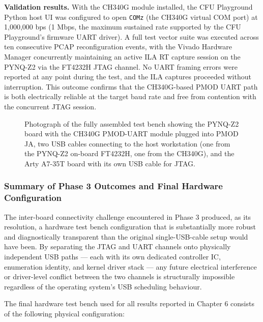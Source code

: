 \textbf{Validation results.} With the CH340G module installed, the CFU Playground Python host UI was configured to open \texttt{COMz} (the CH340G virtual COM port) at 1,000,000 bps (1 Mbps, the maximum sustained rate supported by the CFU Playground's firmware UART driver). A full test vector suite was executed across ten consecutive PCAP reconfiguration events, with the Vivado Hardware Manager concurrently maintaining an active ILA RT capture session on the PYNQ-Z2 via the FT4232H JTAG channel. No UART framing errors were reported at any point during the test, and the ILA captures proceeded without interruption. This outcome confirms that the CH340G-based PMOD UART path is both electrically reliable at the target baud rate and free from contention with the concurrent JTAG session.

\begin{figure}[htbp]
\centering
{}
\caption{Photograph of the fully assembled test bench showing the PYNQ-Z2 board with the CH340G PMOD-UART module plugged into PMOD JA, two USB cables connecting to the host workstation (one from the PYNQ-Z2 on-board FT4232H, one from the CH340G), and the Arty A7-35T board with its own USB cable for JTAG.}
\end{figure}

\subsubsection{Summary of Phase 3 Outcomes and Final Hardware Configuration}

The inter-board connectivity challenge encountered in Phase 3 produced, as its resolution, a hardware test bench configuration that is substantially more robust and diagnostically transparent than the original single-USB-cable setup would have been. By separating the JTAG and UART channels onto physically independent USB paths — each with its own dedicated controller IC, enumeration identity, and kernel driver stack — any future electrical interference or driver-level conflict between the two channels is structurally impossible regardless of the operating system's USB scheduling behaviour.

The final hardware test bench used for all results reported in Chapter 6 consists of the following physical configuration:

